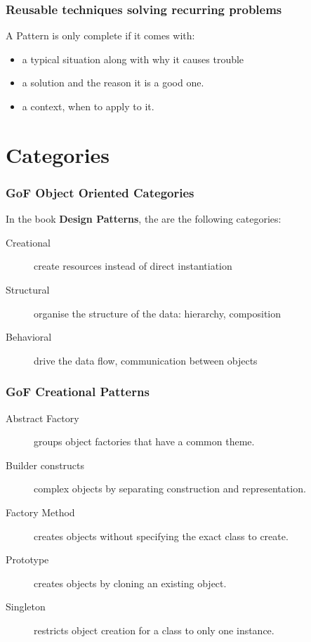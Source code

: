 \documentclass{beamer}
\begin{document}
\begin{frame}
\frametitle {Reusable techniques solving recurring problems}
A Pattern is only complete if it comes with:
\begin{itemize}
 \item a typical situation along with why it causes trouble
 \item a solution and the reason it is a good one.
 \item a context, when to apply to it.
\end{itemize}
\end{frame}

\section{Categories}

\begin{frame}
\frametitle {GoF Object Oriented Categories}
 In the book \textbf{Design Patterns}, the are the following categories:
\begin{description}
 \item [Creational] create resources instead of direct instantiation
 \item [Structural] organise the structure of the data: hierarchy, composition
 \item [Behavioral] drive the data flow, communication between objects
\end{description}
\end{frame}

\begin{frame}
\frametitle {GoF Creational Patterns}

\begin{description}
 \item [Abstract Factory] groups object factories that have a common theme.
 \item [Builder constructs] complex objects by separating construction and representation.
 \item [Factory Method] creates objects without specifying the exact class to create.
 \item [Prototype] creates objects by cloning an existing object.
 \item [Singleton] restricts object creation for a class to only one instance.
\end{description}
\end{frame}
\end{document}
